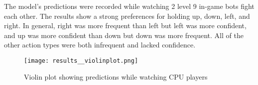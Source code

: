 The model's predictions were recorded while watching 2 level 9 in-game bots fight each other. The results show a strong preferences for holding up, down, left, and right. In general, right was more frequent than left but left was more confident, and up was more confident than down but down was more frequent. All of the other action types were both infrequent and lacked confidence.

\begin{figure}
    \caption{Violin plot showing predictions while watching CPU players \cite{SciPy}}
    \centering
    \texttt{[image: results\_\_violinplot.png]} \\
\end{figure}

